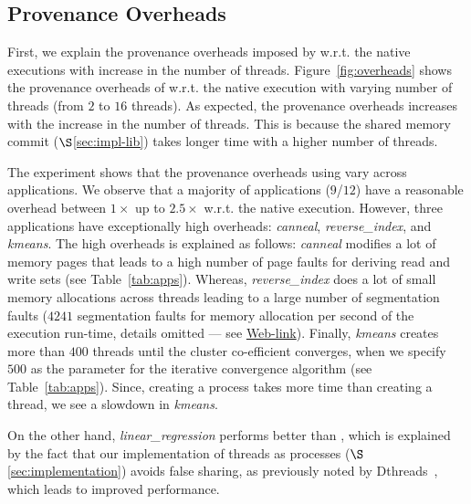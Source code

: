 


\subsection{Provenance Overheads}
\label{subsec:overheads}
First, we explain the provenance overheads imposed by \projecttitle w.r.t. the native \pthreads executions with increase in the number of threads. Figure~\ref{fig:overheads} shows the provenance overheads of \projecttitle w.r.t. the native \pthreads execution with varying number of
threads (from $2$ to $16$ threads). As expected, the provenance overheads increases with the increase in the number of threads. This is because the shared memory commit ($\S$\ref{sec:impl-lib}) takes longer time with a higher number of threads. 

The experiment shows that the provenance overheads using \projecttitle vary across applications. 
We observe that a majority of applications ($9$/$12$) have a reasonable overhead between $1\times$ up to $2.5\times$ w.r.t. the native execution. However, three applications have exceptionally high overheads:  {\em canneal}, {\em reverse\_index}, and {\em kmeans}. The high overheads is explained as follows: {\em canneal} modifies a lot of memory pages that leads to a high number of page faults for deriving read and write sets (see Table~\ref{tab:apps}). Whereas, {\em reverse\_index} does a lot of small memory allocations across threads leading to a large number of segmentation faults ($4241$ segmentation faults for memory allocation per second of the execution run-time, details omitted --- see  \href{https://mic92.github.io/inspector/index.html\#measurement_table}{Web-link}).  Finally, {\em kmeans} creates more than $400$ threads until the cluster co-efficient converges, when we specify $500$ as the parameter for the iterative convergence algorithm (see Table~\ref{tab:apps}). Since, creating a process takes more time than creating a thread, we see a slowdown in {\em kmeans}.


On the other hand, {\em linear\_regression} performs better than \pthreads, which is explained by the fact that our implementation of threads as processes ($\S$\ref{sec:implementation})  avoids false sharing, as previously noted by Dthreads~\cite{dthreads-sosp-2011}, which leads to improved performance.



